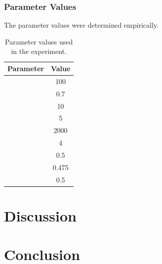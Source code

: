 \documentclass[a4paper,12pt]{article}
\begin{document}
        \subsubsection*{Parameter Values}
            \par{
                The parameter values were determined empirically.
                \begin{table}[h!]
                    \centering
                        \small 
                        \begin{tabular}{ | l | c | }

                            \hline
                            \textbf{Parameter} & \textbf{Value} \\
                            \hline  
                            \nameref{subsubsec:mg} & 100 \\ 
                            \nameref{subsubsec:kf} & 0.7 \\ 
                            \nameref{subsubsec:mmd} & 10 \\ 
                            \nameref{subsubsec:cmd} & 5 \\ 
                            \nameref{subsubsec:ps} & 2000 \\ 
                            \nameref{subsubsec:ts} & 4 \\ 
                            \nameref{subsubsec:car} & 0.5 \\ 
                            \nameref{subsubsec:mar} & 0.475 \\ 
                            \nameref{subsubsec:har} & 0.5 \\
                            \hline 
                        \end{tabular}
                        \caption{Parameter values used in the experiment.} 
                \end{table} 
            }
       

\section{Discussion} \label{sec:discussion}
    \par{

    }
\section{Conclusion} \label{sec:conclusion}
    \par{

    }
\newpage
% 

\end{document}
